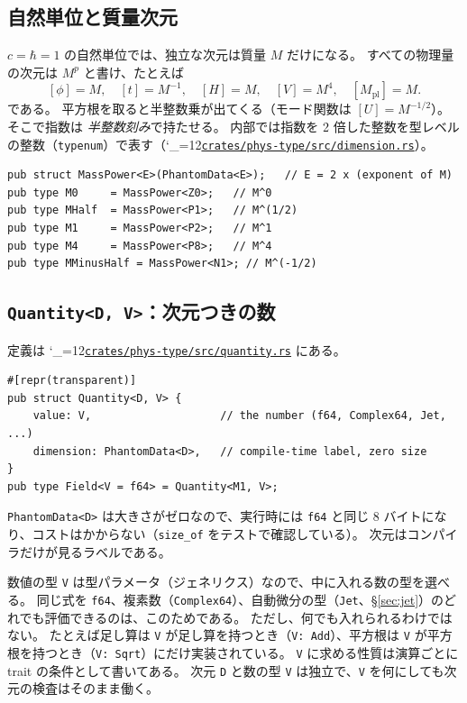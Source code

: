 \documentclass[a4paper,11pt]{ltjsarticle}
\newcommand{\Mpl}{M_{\mathrm{pl}}}
\newcommand{\code}[1]{\texttt{#1}}
\newcommand{\repourl}{https://github.com/inuverse44/phys-type}
\newcommand{\reporev}{b1fea87}
\newcommand{\repo}{\begingroup\catcode`\_=12\relax\repoaux}
\newcommand{\repoaux}[1]{\href{\repourl/blob/\reporev/#1}{\nolinkurl{#1}}\endgroup}
\begin{document}
\subsection{自然単位と質量次元}

$c=\hbar=1$ の自然単位では、独立な次元は質量 $M$ だけになる。
すべての物理量の次元は $M^{p}$ と書け、たとえば
\[
[\phi]=M,\quad [t]=M^{-1},\quad [H]=M,\quad [V]=M^4,\quad [\Mpl]=M .
\]
である。
平方根を取ると半整数乗が出てくる（モード関数は $[U]=M^{-1/2}$）。
そこで指数は \emph{半整数刻み}で持たせる。
内部では指数を 2 倍した整数を型レベルの整数（\code{typenum}）で表す（\repo{crates/phys-type/src/dimension.rs}）。

\begin{lstlisting}
pub struct MassPower<E>(PhantomData<E>);   // E = 2 x (exponent of M)
pub type M0     = MassPower<Z0>;   // M^0
pub type MHalf  = MassPower<P1>;   // M^(1/2)
pub type M1     = MassPower<P2>;   // M^1
pub type M4     = MassPower<P8>;   // M^4
pub type MMinusHalf = MassPower<N1>; // M^(-1/2)
\end{lstlisting}

\subsection{\texorpdfstring{\code{Quantity<D, V>}}{Quantity<D, V>}：次元つきの数}

定義は \repo{crates/phys-type/src/quantity.rs} にある。

\begin{lstlisting}
#[repr(transparent)]
pub struct Quantity<D, V> {
    value: V,                    // the number (f64, Complex64, Jet, ...)
    dimension: PhantomData<D>,   // compile-time label, zero size
}
pub type Field<V = f64> = Quantity<M1, V>;
\end{lstlisting}

\code{PhantomData<D>} は大きさがゼロなので、実行時には \code{f64} と同じ 8 バイトになり、コストはかからない（\code{size\_of} をテストで確認している）。
次元はコンパイラだけが見るラベルである。

数値の型 \code{V} は型パラメータ（ジェネリクス）なので、中に入れる数の型を選べる。
同じ式を \code{f64}、複素数（\code{Complex64}）、自動微分の型（\code{Jet}、\S\ref{sec:jet}）のどれでも評価できるのは、このためである。
ただし、何でも入れられるわけではない。
たとえば足し算は \code{V} が足し算を持つとき（\code{V: Add}）、平方根は \code{V} が平方根を持つとき（\code{V: Sqrt}）にだけ実装されている。
\code{V} に求める性質は演算ごとに trait の条件として書いてある。
次元 \code{D} と数の型 \code{V} は独立で、\code{V} を何にしても次元の検査はそのまま働く。
\end{document}
